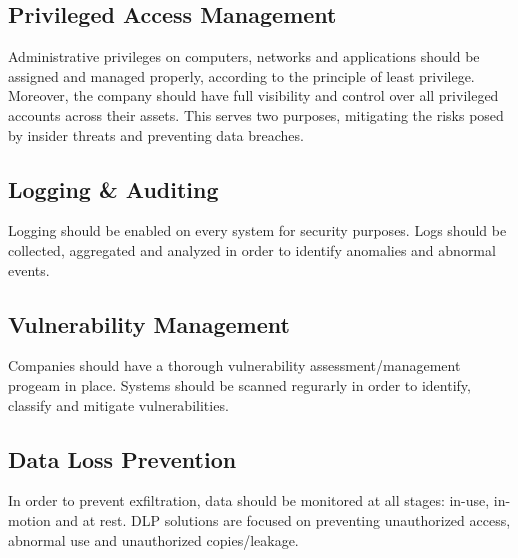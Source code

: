 \documentclass[12pt]{extarticle}
\begin{document}
	\subsection{Privileged Access Management}
	Administrative privileges on computers, networks and applications should be assigned and managed properly, according to the principle of least privilege. Moreover, the company should have full visibility and control over all privileged accounts across their assets. This serves two purposes, mitigating the risks posed by insider threats and preventing data breaches.
	\subsection{Logging \& Auditing}
	Logging should be enabled on every system for security purposes. Logs should be collected, aggregated and analyzed in order to identify anomalies and abnormal events.
	\subsection{Vulnerability Management}
	Companies should have a thorough vulnerability assessment/management progeam in place. Systems should be scanned regurarly in order to identify, classify and mitigate vulnerabilities.
	\subsection{Data Loss Prevention}
	In order to prevent exfiltration, data should be monitored at all stages: in-use, in-motion and at rest. DLP solutions are focused on preventing unauthorized access, abnormal use and unauthorized copies/leakage.
	\newpage
\end{document}
